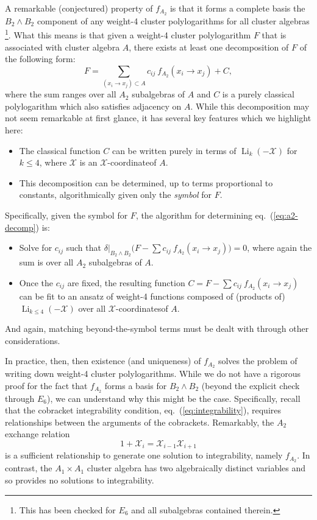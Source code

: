 \documentclass[11pt]{article}
\DeclareMathOperator{\Li}{Li}
\def\x{\mathcal{X}}
\def\xcoord{$\mathcal{X}$-coordinate}
\def\xcoords{$\mathcal{X}$-coordinates}
\begin{document}
A remarkable (conjectured) property of $f_{A_2}$ is that it forms a complete basis the $B_2 \wedge B_2$ component of any weight-4 cluster polylogarithms for all cluster algebras \footnote{This has been checked for $E_6$ and all subalgebras contained therein.}. What this means is that given a weight-4 cluster polylogarithm $F$ that is associated with cluster algebra $A$, there exists at least one decomposition of $F$ of the following form:
\begin{equation}\label{eq:a2-decomp}
	F = \sum_{(x_i\to x_j) \subset A} c_{ij} ~f_{A_2}(x_i \to x_j) + C, 
\end{equation}
where the sum ranges over all $A_2$ subalgebras of $A$ and $C$ is a purely classical polylogarithm which also satisfies adjacency on $A$. While this decomposition may not seem remarkable at first glance, it has several key features which we highlight here:
\begin{itemize}
	\item The classical function $C$ can be written purely in terms of $\Li_{k}(-\x)$ for $k\le4$, where $\x$ is an \xcoord of $A$.
	\item This decomposition can be determined, up to terms proportional to constants, algorithmically given only the \emph{symbol} for $F$.
\end{itemize}
Specifically, given the symbol for $F$, the algorithm for determining eq.~(\ref{eq:a2-decomp}) is: 
\begin{itemize}
	\item Solve for $c_{ij}$ such that $\delta|_{B_2 \wedge B_2}\big(F - \sum c_{ij} ~f_{A_2}(x_i \to x_j)\big) = 0$, where again the sum is over all $A_2$ subalgebras of $A$.
	\item Once the $c_{ij}$ are fixed, the resulting function $C = F - \sum c_{ij} ~f_{A_2}(x_i \to x_j)$ can be fit to an ansatz of weight-4 functions composed of (products of) $\Li_{k\le4}(-\x)$ over all \xcoords of $A$. 
\end{itemize}
And again, matching beyond-the-symbol terms must be dealt with through other considerations. 

In practice, then, then existence (and uniqueness) of $f_{A_2}$ solves the problem of writing down weight-4 cluster polylogarithms. While we do not have a rigorous proof for the fact that $f_{A_2}$ forms a basis for $B_2 \wedge B_2$ (beyond the explicit check through $E_6$), we can understand why this might be the case. Specifically, recall that the cobracket integrability condition, eq.~(\ref{eq:integrability}), requires relationships between the arguments of the cobrackets. Remarkably, the $A_2$ exchange relation
\begin{equation}
	1+\x_i = \x_{i-1}\x_{i+1}
\end{equation}
is a sufficient relationship to generate one solution to integrability, namely $f_{A_2}$. In contrast, the $A_1\times A_1$ cluster algebra has two algebraically distinct variables and so provides no solutions to integrability. 
\end{document}

